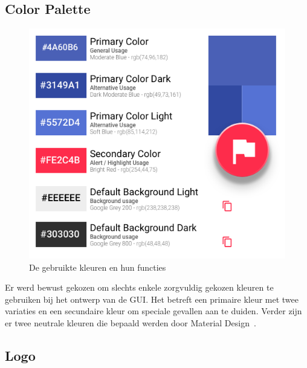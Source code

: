 \documentclass{article}
\begin{document}
\begin{appendices}
\clearpage

\subsection{Color Palette}
\begin{figure}[!h]
\centering
 \includegraphics[width=145mm]{pieteruploads/SKRBL_FRNT_ColorPalette.png}
 \caption{De gebruikte kleuren en hun functies}
\end{figure}

Er werd bewust gekozen om slechts enkele zorgvuldig gekozen kleuren te gebruiken bij het ontwerp van de GUI. Het betreft een primaire kleur met twee variaties en een secundaire kleur om speciale gevallen aan te duiden. Verder zijn er twee neutrale kleuren die bepaald werden door Material Design~\cite{website:Material}.

\clearpage

\subsection{Logo}


\end{appendices}
\end{document}
